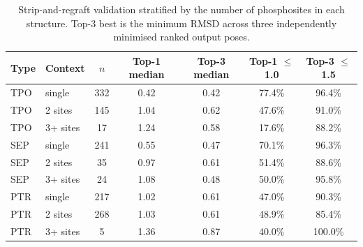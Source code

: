 \begin{table}[h!]
\caption{Strip-and-regraft validation stratified by the number of phosphosites in each structure. Top-3 best is the minimum RMSD across three independently minimised ranked output poses.}
\label{tab:multisite}
\centering
\small
\begin{tabularx}{\textwidth}{l l c c c c c}
\toprule
\textbf{Type} & \textbf{Context} & \textbf{$n$} & \textbf{Top-1 median} & \textbf{Top-3 median} & \textbf{Top-1 $\leq$1.0} & \textbf{Top-3 $\leq$1.5} \\
\midrule
TPO & single & 332 & 0.42 & 0.42 & 77.4\% & 96.4\% \\
TPO & 2 sites & 145 & 1.04 & 0.62 & 47.6\% & 91.0\% \\
TPO & 3+ sites & 17 & 1.24 & 0.58 & 17.6\% & 88.2\% \\
\addlinespace
SEP & single & 241 & 0.55 & 0.47 & 70.1\% & 96.3\% \\
SEP & 2 sites & 35 & 0.97 & 0.61 & 51.4\% & 88.6\% \\
SEP & 3+ sites & 24 & 1.08 & 0.48 & 50.0\% & 95.8\% \\
\addlinespace
PTR & single & 217 & 1.02 & 0.61 & 47.0\% & 90.3\% \\
PTR & 2 sites & 268 & 1.03 & 0.61 & 48.9\% & 85.4\% \\
PTR & 3+ sites & 5 & 1.36 & 0.87 & 40.0\% & 100.0\% \\
\bottomrule
\end{tabularx}
\end{table}
